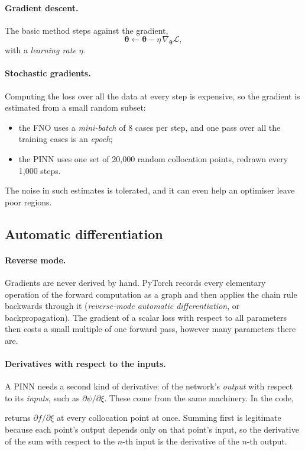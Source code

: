 \paragraph{Gradient descent.}
The basic method steps against the gradient,
\begin{equation}
  \bm\theta \leftarrow \bm\theta - \eta\,\nabla_{\bm\theta}\mathcal L,
\end{equation}
with a \emph{learning rate} $\eta$.

\paragraph{Stochastic gradients.}
Computing the loss over all the data at every step is expensive, so the gradient is estimated
from a small random subset:
\begin{itemize}
  \item the FNO uses a \emph{mini-batch} of 8 cases per step, and one pass over all the training
    cases is an \emph{epoch};
  \item the PINN uses one set of 20,000 random collocation points, redrawn every 1,000 steps.
\end{itemize}
The noise in such estimates is tolerated, and it can even help an optimiser leave poor regions.

\subsection{Automatic differentiation}
\label{app:autodiff}

\paragraph{Reverse mode.}
Gradients are never derived by hand. PyTorch records every elementary operation of the forward
computation as a graph and then applies the chain rule backwards through it (\emph{reverse-mode
automatic differentiation}, or backpropagation). The gradient of a scalar loss with respect to all
parameters then costs a small multiple of one forward pass, however many parameters there are.

\paragraph{Derivatives with respect to the inputs.}
A PINN needs a second kind of derivative: of the network's \emph{output} with respect to its
\emph{inputs}, such as $\partial\psi/\partial\xi$. These come from the same machinery. In the code,
\begin{center}
\end{center}
returns $\partial f/\partial\xi$ at every collocation point at once. Summing first is legitimate
because each point's output depends only on that point's input, so the derivative of the sum with
respect to the $n$-th input is the derivative of the $n$-th output.

